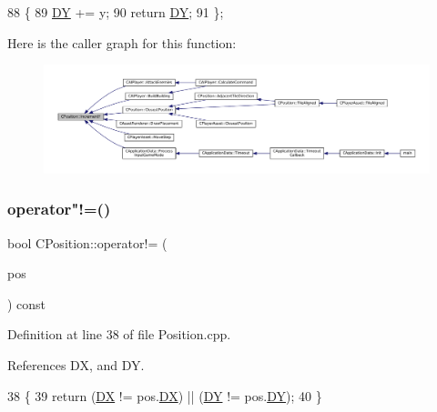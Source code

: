 \begin{DoxyCode}
88                              \{
89             \hyperlink{classCPosition_a84139c9e8eb547e7cf3cb851739943a4}{DY} += y;
90             \textcolor{keywordflow}{return} \hyperlink{classCPosition_a84139c9e8eb547e7cf3cb851739943a4}{DY};
91         \};
\end{DoxyCode}
Here is the caller graph for this function\+:
\nopagebreak
\begin{figure}[H]
\begin{center}
\leavevmode
\includegraphics[width=350pt]{classCPosition_a3f2a26798bb27b1252ff1be303b3adfc_icgraph}
\end{center}
\end{figure}
\hypertarget{classCPosition_ad7a23f4b734883e26de15c2487218b07}{}\label{classCPosition_ad7a23f4b734883e26de15c2487218b07} 
\subsubsection{\texorpdfstring{operator"!=()}{operator!=()}}
{\footnotesize\ttfamily bool C\+Position\+::operator!= (\begin{DoxyParamCaption}\item[{const \hyperlink{classCPosition}{C\+Position} \&}]{pos }\end{DoxyParamCaption}) const}



Definition at line 38 of file Position.\+cpp.



References DX, and DY.


\begin{DoxyCode}
38                                                     \{
39     \textcolor{keywordflow}{return} (\hyperlink{classCPosition_a28445f9b872169715919074d82044eda}{DX} != pos.\hyperlink{classCPosition_a28445f9b872169715919074d82044eda}{DX}) || (\hyperlink{classCPosition_a84139c9e8eb547e7cf3cb851739943a4}{DY} != pos.\hyperlink{classCPosition_a84139c9e8eb547e7cf3cb851739943a4}{DY});
40 \}
\end{DoxyCode}
\hypertarget{classCPosition_ae131ec912eb7272d2bdfbdcbb7848acb}{}\label{classCPosition_ae131ec912eb7272d2bdfbdcbb7848acb} 

